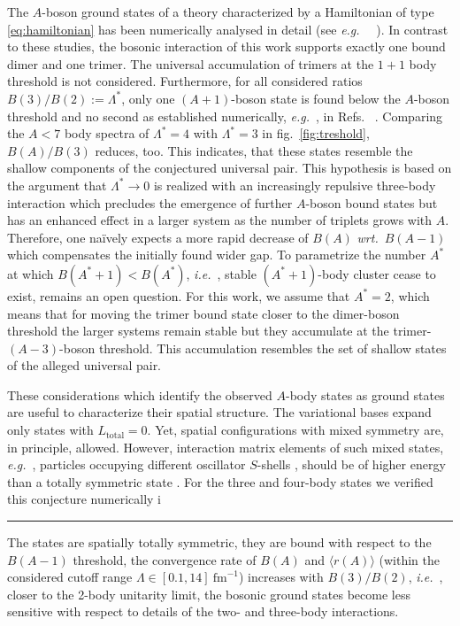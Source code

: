 \documentclass[preprint,12pt]{elsarticle}
\newcommand{\es}{1\text{\scriptsize s}}
\newcommand{\zs}{2\text{\scriptsize s}}
\newcommand{\wrt}{\textit{wrt.}~}
\newcommand{\eg}{\textit{e.g.}~}
\newcommand{\ie}{\textit{i.e.}~}
\newcommand{\rms}[1]{\ensuremath{\langle r(#1)\rangle}}
\newcommand{\figref}[1]{fig.~\ref{#1}}
\begin{document}
The $A$-boson ground states of a theory characterized by a Hamiltonian of
type \eqref{eq:hamiltonian}
has been numerically analysed in detail (see \eg~ \cite{Bazak:2016wxm,2015PhRvA..92c3626Y,Gattobigio:2012tk,vonStecher:2011zz,Gattobigio:2011ey}).
In contrast to these studies, the bosonic interaction of this work supports
exactly one bound dimer and one trimer. The universal accumulation of trimers
at the $1+1$ body threshold is not considered. Furthermore, for all considered
ratios $B(3)/B(2):=\Lambda^*$, only one $(A+1)$-boson state is found below
the $A$-boson threshold and no second as established numerically, \eg, in Refs.~
\cite{Hammer:2006ct,2009NatPh...5..417V,vonStecher:2011zz}.
Comparing the $A<7$ body spectra of $\Lambda^*=4$ with $\Lambda^*=3$ in
\figref{fig:treshold}, $B(A)/B(3)$ reduces, too. This indicates, that these states
resemble the shallow components of the conjectured universal pair. This hypothesis is
based on the argument that $\Lambda^*\to0$ is realized with an increasingly repulsive
three-body interaction which precludes the emergence of further $A$-boson bound states
but has an enhanced effect in a larger system as the number of triplets grows
with $A$. Therefore, one na\"ively expects a more rapid decrease of $B(A)$ \wrt $B(A-1)$ which compensates the initially found wider gap. To parametrize the
number $A^*$ at which $B(A^*+1)<B(A^*)$, \ie, stable $(A^*+1)$-body
cluster cease to exist, remains an open question.
For this work, we assume that $A^*=2$, which
means that for moving the trimer bound state closer to the dimer-boson threshold
the larger systems remain stable but they accumulate at the trimer-$(A-3)$-boson
threshold. This accumulation resembles the set of shallow states of the
alleged universal pair.

These considerations which identify the observed $A$-body states as ground
states are useful to characterize their spatial structure. The variational
bases expand only states with $L_\text{total}=0$. Yet, spatial configurations with
mixed symmetry are, in principle, allowed. However, interaction matrix elements
of such mixed states, \eg, particles occupying different oscillator $S$-shells
\scalebox{0.8}{$\young(\es,\zs)$}, 
should be of higher energy than a totally symmetric state
\scalebox{0.8}{$\young(\es\es)$}. For the three and four-body states we verified
this conjecture numerically i 

\noindent\rule{\textwidth}{1pt}

The states are spatially totally symmetric, they are bound with respect to the
$B(A-1)$ threshold, the convergence rate of $B(A)$ and $\rms{A}$ (within the considered cutoff range
$\Lambda\in[0.1,14]~\text{fm}^{-1}$) increases with $B(3)/B(2)$, \ie, closer to the 2-body unitarity limit, the bosonic
ground states become less sensitive with respect to details of the two- and three-body interactions.
\end{document}
